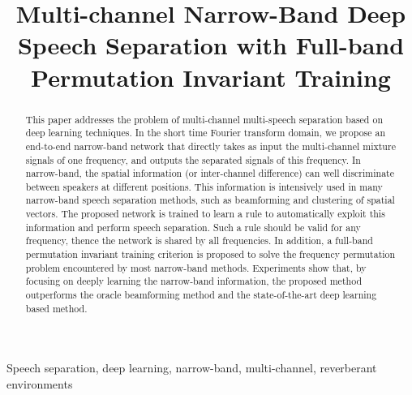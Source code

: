 \documentclass{article}
\title{Multi-channel Narrow-Band Deep Speech Separation with Full-band Permutation Invariant Training}
\begin{document}
%
\maketitle
%
\begin{abstract}
This paper addresses the problem of multi-channel multi-speech separation based on deep learning techniques.
In the short time Fourier transform domain, we propose an end-to-end narrow-band network that directly takes as input the multi-channel mixture signals of one frequency, and outputs the separated signals of this frequency.
In narrow-band, the spatial information (or inter-channel difference) can well discriminate between speakers at different positions.
This information is intensively used in many narrow-band speech separation methods, such as beamforming and clustering of spatial vectors.
The proposed network is trained to learn a rule to automatically exploit this information and perform speech separation.
Such a rule should be valid for any frequency, thence the network is shared by all frequencies.
In addition, a full-band permutation invariant training criterion is proposed to solve the frequency permutation problem encountered by most narrow-band methods.
Experiments show that, by focusing on deeply learning the narrow-band information, the proposed method outperforms the oracle beamforming method and the state-of-the-art deep learning based method. 
\end{abstract}
%
\begin{keywords}
  Speech separation, deep learning, narrow-band, multi-channel, reverberant environments
\end{keywords}
%
\end{document}
